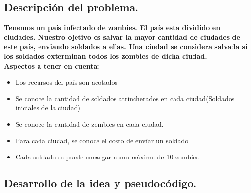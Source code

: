 \subsection{Descripción del problema.}

\vspace*{0.3cm}

\textbf{
Tenemos un país infectado de zombies. El país esta dividido en ciudades. Nuestro ojetivo es salvar la mayor cantidad de ciudades de este país, enviando soldados a ellas. Una ciudad se considera salvada si los soldados exterminan todos los zombies de dicha ciudad.
\\
Aspectos a tener en cuenta:
}

\begin{itemize}
   \item Los recursos del país son acotados 
   \item Se conoce la cantidad de soldados atrincherados en cada ciudad(Soldados iniciales de la ciudad)  
   \item Se conoce la cantidad de zombies en cada ciudad.
   \item Para cada ciudad, se conoce el costo de envíar un soldado
   \item Cada soldado se puede encargar como máximo de 10 zombies 
\end{itemize}




\newpage
\subsection{Desarrollo de la idea y pseudocódigo.}

\vspace*{0.3cm}

